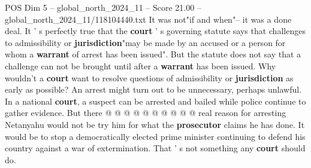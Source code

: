 \begin{textsample}{POS Dim 5 – global\_north\_2024\_11 – Score 21.00 – global\_north\_2024\_11/118104440.txt}
It was not"if and when"-- it was a done deal.
It ' s perfectly true that the \textbf{court} ' s governing statute says that challenges to admissibility or \textbf{jurisdiction}"may be made by an accused or a person for whom a \textbf{warrant} of arrest has been issued".
But the statute does not say that a challenge can not be brought until after a \textbf{warrant} has been issued.
Why wouldn't a \textbf{court} want to resolve questions of admissibility or \textbf{jurisdiction} as early as possible?
An arrest might turn out to be unnecessary, perhaps unlawful.
In a national \textbf{court}, a suspect can be arrested and bailed while police continue to gather evidence.
But there @ @ @ @ @ @ @ @ @ @ real reason for arresting Netanyahu would not be try him for what the \textbf{prosecutor} claims he has done.
It would be to stop a democratically elected prime minister continuing to defend his country against a war of extermination.
That ' s not something any \textbf{court} should do.

\end{textsample}
